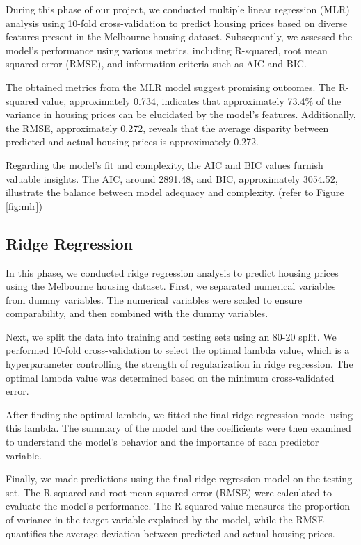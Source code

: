 \documentclass[12pt,doublespace]{article}
\begin{document}
	During this phase of our project, we conducted multiple linear regression (MLR) analysis using 10-fold cross-validation to predict housing prices based on diverse features present in the Melbourne housing dataset. Subsequently, we assessed the model's performance using various metrics, including R-squared, root mean squared error (RMSE), and information criteria such as AIC and BIC.
	
	The obtained metrics from the MLR model suggest promising outcomes. The R-squared value, approximately 0.734, indicates that approximately 73.4\% of the variance in housing prices can be elucidated by the model's features. Additionally, the RMSE, approximately 0.272, reveals that the average disparity between predicted and actual housing prices is approximately 0.272.
	
	Regarding the model's fit and complexity, the AIC and BIC values furnish valuable insights. The AIC, around 2891.48, and BIC, approximately 3054.52, illustrate the balance between model adequacy and complexity. (refer to Figure \ref{fig:mlr})
	
		
	\subsection{Ridge Regression}
	In this phase, we conducted ridge regression analysis to predict housing prices using the Melbourne housing dataset. First, we separated numerical variables from dummy variables. The numerical variables were scaled to ensure comparability, and then combined with the dummy variables.
	
	Next, we split the data into training and testing sets using an 80-20 split. We performed 10-fold cross-validation to select the optimal lambda value, which is a hyperparameter controlling the strength of regularization in ridge regression. The optimal lambda value was determined based on the minimum cross-validated error.
	
	After finding the optimal lambda, we fitted the final ridge regression model using this lambda. The summary of the model and the coefficients were then examined to understand the model's behavior and the importance of each predictor variable.
	
	Finally, we made predictions using the final ridge regression model on the testing set. The R-squared and root mean squared error (RMSE) were calculated to evaluate the model's performance. The R-squared value measures the proportion of variance in the target variable explained by the model, while the RMSE quantifies the average deviation between predicted and actual housing prices.
	
\end{document}
